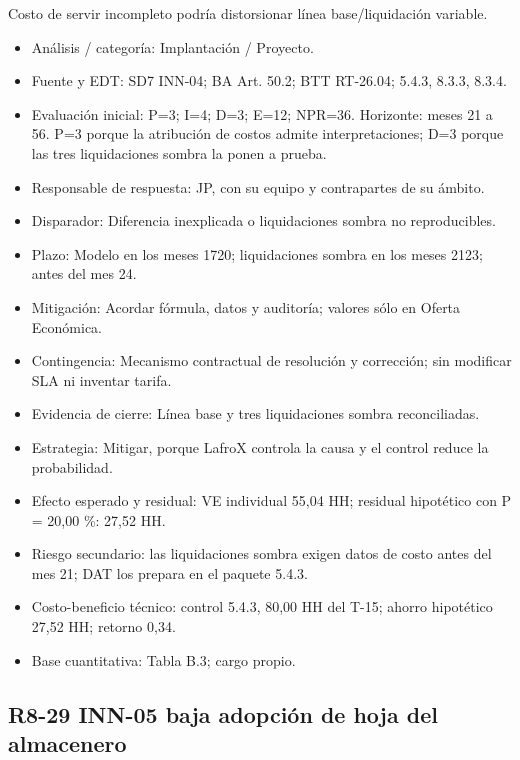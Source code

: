 Costo de servir incompleto podría distorsionar línea base/liquidación variable.

\begin{itemize}[leftmargin=*,itemsep=3pt]
\item Análisis / categoría: Implantación / Proyecto.
\item Fuente y EDT: SD7 INN-04; BA Art. 50.2; BTT RT-26.04; 5.4.3, 8.3.3, 8.3.4.
\item Evaluación inicial: P=3; I=4; D=3; E=12; NPR=36. Horizonte: meses 21 a 56. P=3 porque la atribución de costos admite interpretaciones; D=3 porque las tres liquidaciones sombra la ponen a prueba.
\item Responsable de respuesta: JP, con su equipo y contrapartes de su ámbito.
\item Disparador: Diferencia inexplicada o liquidaciones sombra no reproducibles.
\item Plazo: Modelo en los meses 17\textendash{}20; liquidaciones sombra en los meses 21\textendash{}23; antes del mes 24.
\item Mitigación: Acordar fórmula, datos y auditoría; valores sólo en Oferta Económica.
\item Contingencia: Mecanismo contractual de resolución y corrección; sin modificar SLA ni inventar tarifa.
\item Evidencia de cierre: Línea base y tres liquidaciones sombra reconciliadas.
\item Estrategia: Mitigar, porque LafroX controla la causa y el control reduce la probabilidad.
\item Efecto esperado y residual: VE individual 55,04 HH; residual hipotético con P = 20,00 \%: 27,52 HH.
\item Riesgo secundario: las liquidaciones sombra exigen datos de costo antes del mes 21; DAT los prepara en el paquete 5.4.3.
\item Costo-beneficio técnico: control 5.4.3, 80,00 HH del T-15; ahorro hipotético 27,52 HH; retorno 0,34.
\item Base cuantitativa: Tabla B.3; cargo propio.
\end{itemize}

\subsection*{R8-29 \textemdash{} INN-05 baja adopción de hoja del almacenero}

